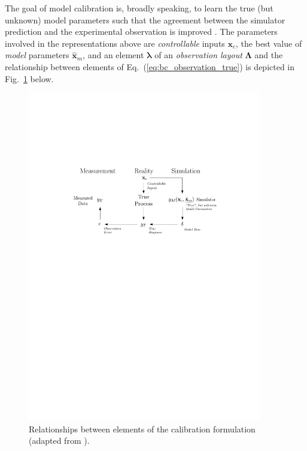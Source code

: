 The goal of model calibration is, broadly speaking, to learn the true (but unknown) model parameters such that the agreement between the simulator prediction and the experimental observation is improved \cite{Kennedy2001,Ling2014}.
The parameters involved in the representations above are \emph{controllable} inputs $\bm{x}_c$,
the best value of \emph{model} parameters $\hat{\bm{x}}_m$, and an element $\boldsymbol{\lambda}$ of an \emph{observation layout} $\boldsymbol{\Lambda}$ and the relationship between elements of Eq.~(\ref{eq:bc_observation_true}) is depicted in Fig.~\ref{fig:ch5_hm_error_model} below.
\begin{figure}[bth]	
	\centering
	\includegraphics[width=0.91\textwidth]{../figures/chapter5/figures/HMErrorModel}
	\caption[Relationships between elements of the calibration formulation.]{Relationships between elements of the calibration formulation (adapted from \cite{Huard2006}).}
	\label{fig:ch5_hm_error_model}
\end{figure}

